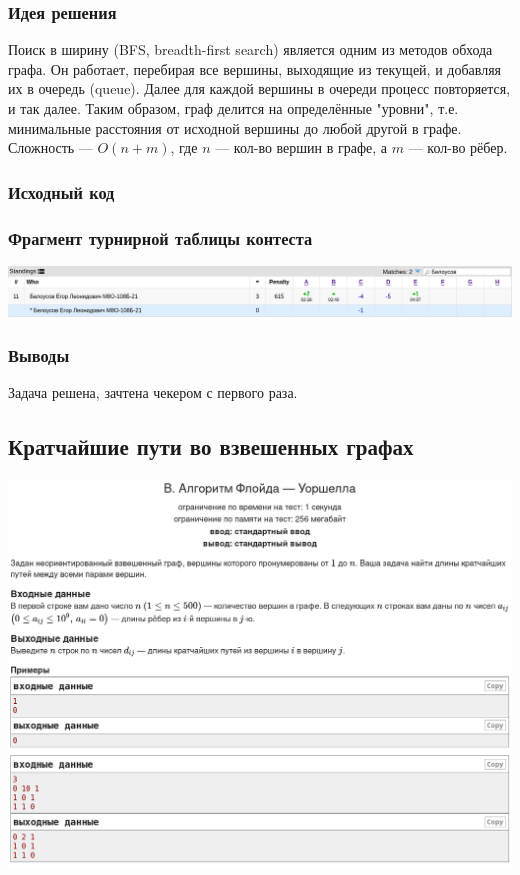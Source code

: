 \subsubsection*{Идея решения}

Поиск в ширину (BFS, breadth-first search) является одним из методов обхода графа. Он работает, перебирая все вершины, выходящие из текущей, и добавляя их в очередь (queue). Далее для каждой вершины в очереди процесс повторяется, и так далее. Таким образом, граф делится на определённые "уровни"{}, т.е. минимальные расстояния от исходной вершины до любой другой в графе. Сложность --- $O(n + m)$, где $n$ --- кол-во вершин в графе, а $m$ --- кол-во рёбер.

\subsubsection*{Исходный код}


\subsubsection*{Фрагмент турнирной таблицы контеста}
\begin{center}
\includegraphics[width=\textwidth]{standings/20220707/table.png}\newline\noindent
\end{center}

\subsubsection*{Выводы}

Задача решена, зачтена чекером с первого раза.

\pagebreak

\subsection*{Кратчайшие пути во взвешенных графах}
\begin{center}
\includegraphics[width=\textwidth]{statements/20220708/B.png}
\end{center}
